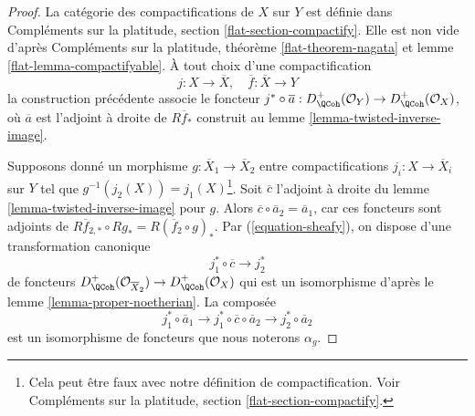 \begin{proof}
La catégorie des compactifications de $X$ sur $Y$ est définie dans Compléments sur la platitude, section \ref{flat-section-compactify}. Elle est non vide d'après Compléments sur la platitude, théorème \ref{flat-theorem-nagata} et lemme \ref{flat-lemma-compactifyable}. À tout choix d'une compactification
$$
j : X \to \overline{X},\quad \overline{f} : \overline{X} \to Y
$$
la construction précédente associe le foncteur $j^* \circ \overline{a} :
D_\QCoh^+(\mathcal{O}_Y) \to D_\QCoh^+(\mathcal{O}_X)$, où $\overline{a}$ est l'adjoint à droite de $R\overline{f}_*$ construit au lemme \ref{lemma-twisted-inverse-image}.

\medskip\noindent
Supposons donné un morphisme $g : \overline{X}_1 \to \overline{X}_2$ entre compactifications $j_i : X \to \overline{X}_i$ sur $Y$ tel que $g^{-1}(j_2(X)) = j_1(X)$\footnote{Cela peut être faux avec notre définition de compactification. Voir Compléments sur la platitude, section \ref{flat-section-compactify}.}. Soit $\overline{c}$ l'adjoint à droite du lemme \ref{lemma-twisted-inverse-image} pour $g$. Alors $\overline{c} \circ \overline{a}_2 = \overline{a}_1$, car ces foncteurs sont adjoints de $R\overline{f}_{2, *} \circ Rg_* = R(\overline{f}_2 \circ g)_*$. Par (\ref{equation-sheafy}), on dispose d'une transformation canonique
$$
j_1^* \circ \overline{c} \longrightarrow j_2^*
$$
de foncteurs
$D^+_\QCoh(\mathcal{O}_{\overline{X}_2}) \to D^+_\QCoh(\mathcal{O}_X)$
qui est un isomorphisme d'après le lemme \ref{lemma-proper-noetherian}. La composée
$$
j_1^* \circ \overline{a}_1 \longrightarrow
j_1^* \circ \overline{c} \circ \overline{a}_2 \longrightarrow
j_2^* \circ \overline{a}_2
$$
est un isomorphisme de foncteurs que nous noterons $\alpha_g$.


\end{proof}
